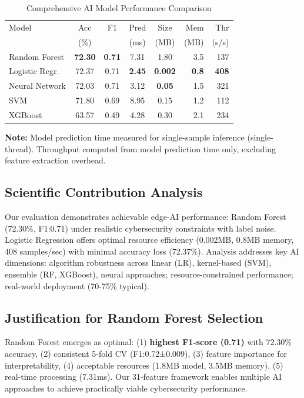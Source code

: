 \begin{table}[htbp]
\centering
{\footnotesize
\caption{Comprehensive AI Model Performance Comparison}
\label{tab:model_comparison}
\begin{tabular}{@{}lccccrr@{}}
\toprule
Model & Acc & F1 & Pred & Size & Mem & Thr \\
 & (\%) &  & (ms) & (MB) & (MB) & (s/s) \\
\midrule
Random Forest & \textbf{72.30} & \textbf{0.71} & 7.31 & 1.80 & 3.5 & 137 \\
Logistic Regr. & 72.37 & 0.71 & \textbf{2.45} & \textbf{0.002} & \textbf{0.8} & \textbf{408} \\
Neural Network & 72.03 & 0.71 & 3.12 & \textbf{0.05} & 1.5 & 321 \\
SVM & 71.80 & 0.69 & 8.95 & 0.15 & 1.2 & 112 \\
XGBoost & 63.57 & 0.49 & 4.28 & 0.30 & 2.1 & 234 \\
\bottomrule
\end{tabular}
}
\end{table}

\noindent \textbf{Note:} Model prediction time measured for single-sample inference (single-thread). Throughput computed from model prediction time only, excluding feature extraction overhead.

\subsection{Scientific Contribution Analysis}

Our evaluation demonstrates achievable edge-AI performance: Random Forest (72.30\%, F1:0.71) under realistic cybersecurity constraints with label noise. Logistic Regression offers optimal resource efficiency (0.002MB, 0.8MB memory, 408 samples/sec) with minimal accuracy loss (72.37\%). Analysis addresses key AI dimensions: algorithm robustness across linear (LR), kernel-based (SVM), ensemble (RF, XGBoost), neural approaches; resource-constrained performance; real-world deployment (70-75\% typical).

\subsection{Justification for Random Forest Selection}

Random Forest emerges as optimal: (1) \textbf{highest F1-score (0.71)} with 72.30\% accuracy, (2) consistent 5-fold CV (F1:0.72±0.009), (3) feature importance for interpretability, (4) acceptable resources (1.8MB model, 3.5MB memory), (5) real-time processing (7.31ms). Our 31-feature framework enables multiple AI approaches to achieve practically viable cybersecurity performance.

